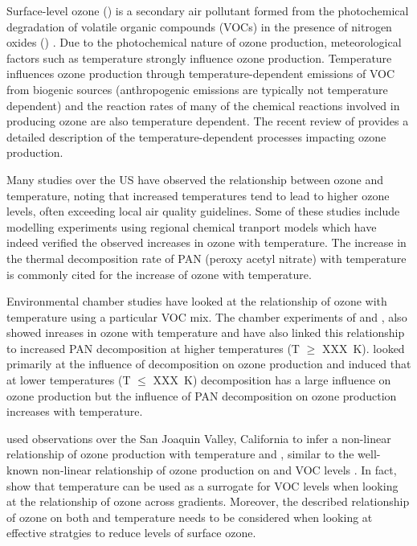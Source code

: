 Surface-level ozone () is a secondary air pollutant formed from the photochemical degradation of volatile organic compounds (VOCs) in the presence of nitrogen oxides () \citep{Atkinson:2000}.
Due to the photochemical nature of ozone production, meteorological factors such as temperature strongly influence ozone production.
Temperature influences ozone production through temperature-dependent emissions of VOC from biogenic sources (anthropogenic emissions are typically not temperature dependent) and the reaction rates of many of the chemical reactions involved in producing ozone are also temperature dependent.
The recent review of \citet{Pusede:2015} provides a detailed description of the temperature-dependent processes impacting ozone production.

Many studies over the US \citep{Sillman:1995a; Pusede:2014}  have observed the relationship between ozone and temperature, noting that increased temperatures tend to lead to higher ozone levels, often exceeding local air quality guidelines.
Some of these studies  include modelling experiments using regional chemical tranport models which have indeed verified the observed increases in ozone with temperature.
The increase in the thermal decomposition rate of PAN (peroxy acetyl nitrate) with temperature is commonly cited for the increase of ozone with temperature.

Environmental chamber studies have looked at the relationship of ozone with temperature using a particular VOC mix.
The chamber experiments of \citet{Carter:XXXX} and \citet{Hatakeyama:XXXX}, also showed inreases in ozone with temperature and have also linked this relationship to increased PAN decomposition at higher temperatures (T $\ge$ XXX~K).
\citet{Hatakeyama:XXXX} looked primarily at the influence of  decomposition on ozone production and induced that at lower temperatures (T $\le$ XXX~K)  decomposition has a large influence on ozone production but the influence of PAN decomposition on ozone production increases with temperature.

\citet{Pusede:2014} used observations over the San Joaquin Valley, California to infer a non-linear relationship of ozone production with temperature and , similar to the well-known non-linear relationship of ozone production on  and VOC levels \citep{Sillman:XXXX; Kleinman:1994}.
In fact, \citet{Pusede:2014} show that temperature can be used as a surrogate for VOC levels when looking at the relationship of ozone across  gradients.
Moreover, the described relationship of ozone on both  and temperature needs to be considered when looking at effective stratgies to reduce levels of surface ozone.

